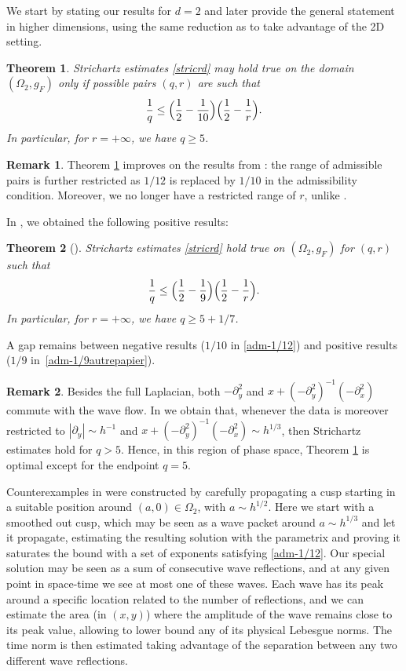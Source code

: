 \documentclass[JEP,XML,SOM,Unicode,NoEqCountersInSection,NoFloatCountersInSection,published]{cedram}
\theoremstyle{plain}
\newtheorem{thm}{Theorem}
\theoremstyle{definition}
\newtheorem{rmq}{Remark}[section]
\begin{document}
We start by stating our results for $d=2$ and later provide the general statement in higher dimensions, using the same reduction as \cite{doi2} to take advantage of the 2D setting.
\begin{thm}
\label{thm-1}
Strichartz estimates \eqref{stricrd} may hold true on the domain $(\Omega_{2},g_{F})$ only if possible pairs $(q,r)$ are
such that
\begin{equation}\label{adm-1/12}
\frac 1q\leq \Bigl(\frac{1} 2 -\frac 1 {10}\Bigr)\Bigl(\frac{1}{2}-\frac{1}{r}\Bigr).
\end{equation}
In particular, for $r=+\infty$, we have $q\geq 5$.
\end{thm}
\begin{rmq} Theorem \ref{thm-1} improves on the results from
\cite{doi}: the range of admissible pairs is further restricted as $1/12$ is replaced by $1/10$ in the admissibility condition. Moreover, we no longer have a restricted range of $r$, unlike \cite{doi}.
\end{rmq}
In \cite{ILP3}, we obtained the following positive results:
\begin{thm}[\cite{ILP3}]
Strichartz estimates \eqref{stricrd} hold true on $(\Omega_{2},g_{F})$ for $(q,r)$ such that
\begin{equation}\label{adm-1/9autrepapier}
\frac 1q\leq \Bigl(\frac{1} 2 -\frac 1 {9}\Bigr)\Bigl(\frac{1}{2}-\frac{1}{r}\Bigr).
\end{equation}
In particular, for $r=+\infty$, we have $q\geq 5+1/7$.
\end{thm}
A gap remains between negative results ($1/10$ in \eqref{adm-1/12}) and positive results ($1/9$ in~\eqref{adm-1/9autrepapier}).
\begin{rmq} Besides the full Laplacian, both $-\partial_{y}^{2}$ and $x+(-\partial^{2}_{y})^{-1}(-\partial_{x}^{2})$ commute with the wave flow. In \cite{ILP3} we obtain that, whenever the data is moreover restricted to $|\partial_{y}|\sim h^{-1}$ and $x+(-\partial^{2}_{y})^{-1}(-\partial_{x}^{2})\sim h^{1/3}$, then Strichartz estimates hold for $q>5$. Hence, in this region of phase space, Theorem \ref{thm-1} is optimal except for the endpoint $q=5$.
\end{rmq}
Counterexamples in \cite{doi} were constructed by carefully
propagating a cusp starting in a suitable position around $(a,0)\in \Omega_{2}$, with $a\sim
h^{1/2}$. Here we start with a smoothed out cusp, which may be seen as a wave packet around $a\sim h^{1/3}$
and let it propagate, estimating the resulting solution with the
parametrix and proving it saturates the bound with a set of exponents satisfying \eqref{adm-1/12}. Our special solution may be seen as a sum of consecutive wave reflections, and at any given point in space-time we see at most one of these waves. Each wave has its peak around a specific location related to the number of reflections, and we can estimate the area (in $(x,y)$) where the amplitude of the wave remains close to its peak value, allowing to lower bound any of its physical Lebesgue norms. The time norm is then estimated taking advantage of the separation between any two different wave reflections.
\end{document}
